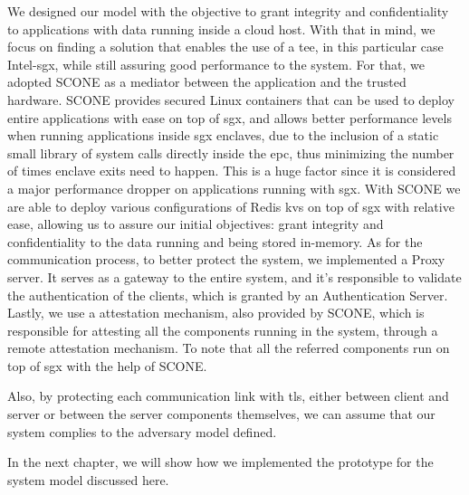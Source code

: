 We designed our model with the objective to grant integrity and confidentiality to applications with data running inside a cloud host. With that in mind, we focus on finding a solution that enables the use of a \gls{tee}, in this particular case Intel-\gls{sgx}, while still assuring good performance to the system. 
For that, we adopted SCONE as a mediator between the application and the trusted hardware. SCONE provides secured Linux containers that can be used to deploy entire applications with ease on top of \gls{sgx}, and allows better performance levels when running applications inside \gls{sgx} enclaves, due to the inclusion of a static small library of system calls directly inside the \gls{epc}, thus minimizing the number of times enclave exits need to happen. This is a huge factor since it is considered a major performance dropper on applications running with \gls{sgx}. 
With SCONE we are able to deploy various configurations of Redis \gls{kvs} on top of \gls{sgx} with relative ease, allowing us to assure our initial objectives:  grant integrity and confidentiality to the data running and being stored in-memory. 
As for the communication process, to better protect the system, we implemented a Proxy server. It serves as a gateway to the entire system, and it's responsible to validate the authentication of the clients, which is granted by an Authentication Server. Lastly, we use a attestation mechanism, also provided by SCONE, which is responsible for attesting all the components running in the system, through a remote attestation mechanism. To note that all the referred components run on top of \gls{sgx} with the help of SCONE. 

Also, by protecting each communication link with \gls{tls}, either between client and server or between the server components themselves, we can assume that our system complies to the adversary model defined.

In the next chapter, we will show how we implemented the prototype for the system model discussed here.

